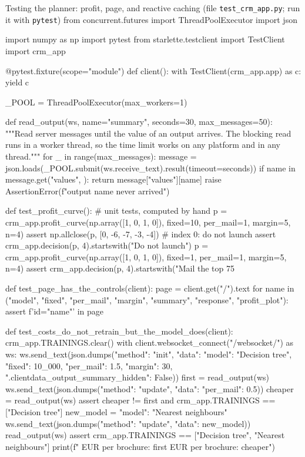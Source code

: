 \begin{pylisting}[label={lst:crmtest}]{Testing the planner: profit, page, and reactive caching (file \texttt{test\_crm\_app.py}; run it with \texttt{pytest})}
from concurrent.futures import ThreadPoolExecutor
import json

import numpy as np
import pytest
from starlette.testclient import TestClient
import crm_app

@pytest.fixture(scope="module")
def client():
    with TestClient(crm_app.app) as c:
        yield c

_POOL = ThreadPoolExecutor(max_workers=1)

def read_output(ws, name="summary", seconds=30, max_messages=50):
    """Read server messages until the value of an output arrives. The blocking read runs
    in a worker thread, so the time limit works on any platform and in any thread."""
    for _ in range(max_messages):
        message = json.loads(_POOL.submit(ws.receive_text).result(timeout=seconds))
        if name in message.get("values", {}):
            return message["values"][name]
    raise AssertionError(f"output {name} never arrived")


def test_profit_curve():                     # unit tests, computed by hand
    p = crm_app.profit_curve(np.array([1, 0, 1, 0]), fixed=10, per_mail=1, margin=5, n=4)
    assert np.allclose(p, [0, -6, -7, -3, -4])     # index 0: do not launch
    assert crm_app.decision(p, 4).startswith("Do not launch")
    p = crm_app.profit_curve(np.array([1, 0, 1, 0]), fixed=1, per_mail=1, margin=5, n=4)
    assert crm_app.decision(p, 4).startswith("Mail the top 75%

def test_page_has_the_controls(client):
    page = client.get("/").text
    for name in ("model", "fixed", "per_mail", "margin", "summary", "response",
                 "profit_plot"):
        assert f'id="{name}"' in page

def test_costs_do_not_retrain_but_the_model_does(client):
    crm_app.TRAININGS.clear()
    with client.websocket_connect("/websocket/") as ws:
        ws.send_text(json.dumps({"method": "init", "data": {
            "model": "Decision tree", "fixed": 10_000, "per_mail": 1.5, "margin": 30,
            ".clientdata_output_summary_hidden": False}}))
        first = read_output(ws)
        ws.send_text(json.dumps({"method": "update", "data": {"per_mail": 0.5}}))
        cheaper = read_output(ws)
        assert cheaper != first and crm_app.TRAININGS == ["Decision tree"]
        new_model = {"model": "Nearest neighbours"}
        ws.send_text(json.dumps({"method": "update", "data": new_model}))
        read_output(ws)
        assert crm_app.TRAININGS == ["Decision tree", "Nearest neighbours"]
    print(f" EUR per brochure: {first} EUR per brochure: {cheaper}")
\end{pylisting}
